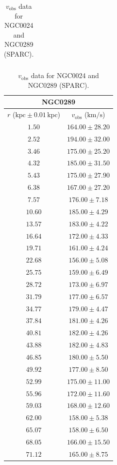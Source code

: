 \documentclass{article}
\newcommand\kpc{\textrm{kpc}}
\newcommand\kmps{\textrm{km}/\textrm{s}}
\newcommand\vobs{\ensuremath{v_{\textrm{obs}}}}
\begin{document}
\begin{table}[h!]
\begin{tabular}{|c|c|}
    \end{tabular}
    \hfill
    \begin{tabular}{|c|c|}
        \hline
        \multicolumn{2}{|c|}{NGC0289} \\
        \hline
        $r$ ($\kpc \pm 0.01 \,\kpc$) & $\vobs$ ($\kmps$) \\
        \hline
        $1.50$ & $164.00 \pm 28.20$ \\
        $2.52$ & $194.00 \pm 32.00$ \\
        $3.46$ & $175.00 \pm 25.20$ \\
        $4.32$ & $185.00 \pm 31.50$ \\
        $5.43$ & $175.00 \pm 27.90$ \\
        $6.38$ & $167.00 \pm 27.20$ \\
        $7.57$ & $176.00 \pm 7.18$ \\
        $10.60$ & $185.00 \pm 4.29$ \\
        $13.57$ & $183.00 \pm 4.22$ \\
        $16.64$ & $172.00 \pm 4.33$ \\
        $19.71$ & $161.00 \pm 4.24$ \\
        $22.68$ & $156.00 \pm 5.08$ \\
        $25.75$ & $159.00 \pm 6.49$ \\
        $28.72$ & $173.00 \pm 6.97$ \\
        $31.79$ & $177.00 \pm 6.57$ \\
        $34.77$ & $179.00 \pm 4.47$ \\
        $37.84$ & $181.00 \pm 4.26$ \\
        $40.81$ & $182.00 \pm 4.26$ \\
        $43.88$ & $182.00 \pm 4.83$ \\
        $46.85$ & $180.00 \pm 5.50$ \\
        $49.92$ & $177.00 \pm 8.50$ \\
        $52.99$ & $175.00 \pm 11.00$ \\
        $55.96$ & $172.00 \pm 11.60$ \\
        $59.03$ & $168.00 \pm 12.60$ \\
        $62.00$ & $158.00 \pm 5.38$ \\
        $65.07$ & $158.00 \pm 6.50$ \\
        $68.05$ & $166.00 \pm 15.50$ \\
        $71.12$ & $165.00 \pm 8.75$ \\
        \hline
    \end{tabular}
    \caption{$\vobs$ data for NGC0024 and NGC0289 (SPARC).}
    \label{tab:raw0024-0289}
\end{table}
\end{document}
